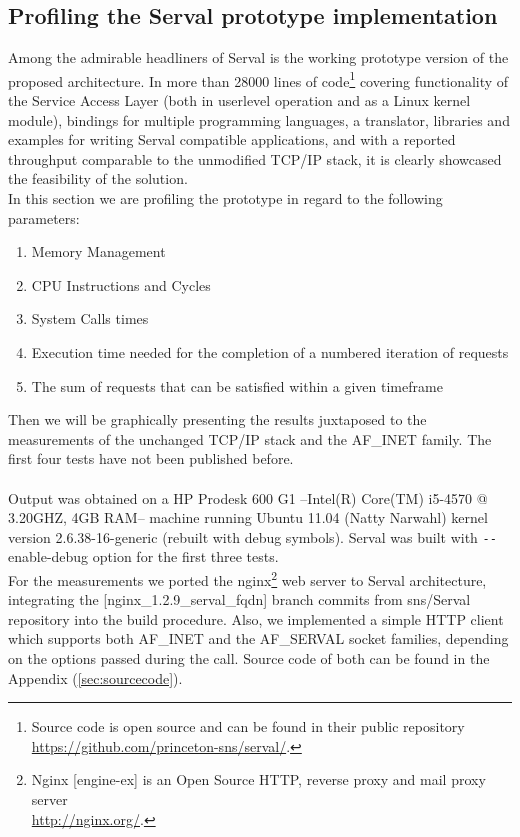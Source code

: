 \subsection{Profiling the Serval prototype implementation}
Among the admirable headliners of Serval is the working prototype version of the proposed architecture.
In more than 28000 lines of code\footnote{Source code is open source and can be found in their public repository\\ \url{https://github.com/princeton-sns/serval/}.} covering functionality of the Service Access Layer (both in userlevel operation and as a Linux kernel module), bindings for multiple programming languages, a translator, libraries and examples for writing Serval compatible applications, and with a reported throughput comparable to the unmodified TCP/IP stack, it is clearly showcased the feasibility of the solution.\\
\indent In this section we are profiling the prototype in regard to the following parameters:
\begin{enumerate}
  \item Memory Management
  \item CPU Instructions and Cycles
  \item System Calls times
  \item Execution time needed for the completion of a numbered iteration of requests
  \item The sum of requests that can be satisfied within a given timeframe
\end{enumerate}
Then we will be graphically presenting the results juxtaposed to the measurements of the unchanged TCP/IP stack and the AF\_INET family. The first four tests have not been published before.

\paragraph{} Output was obtained on a HP Prodesk 600 G1 --Intel(R) Core(TM) i5-4570 @ 3.20GHZ, 4GB RAM-- machine running Ubuntu 11.04 (Natty Narwahl) kernel version 2.6.38-16-generic (rebuilt with debug symbols). Serval was built with \texttt{-{}-}enable-debug option for the first three tests.\\
\indent For the measurements we ported the nginx\footnote{Nginx [engine-ex] is an Open Source HTTP, reverse proxy and mail proxy server\\ \url{http://nginx.org/}.} web server to Serval architecture, integrating the [nginx\_1.2.9\_serval\_fqdn] branch commits from \mbox{sns/Serval} repository into the build procedure.
Also, we implemented a simple HTTP client which supports both AF\_INET and the AF\_SERVAL socket families, depending on the options passed during the call.
Source code of both can be found in the Appendix (\ref{sec:sourcecode}).


\iffalse
gprof
perf
google-profile tools
1) memory (oprofile)
2) CPU cycles (callgrind)
3) system calls time (strace)
4) timed execution of 1000 times
5) requests per second
6) Number of packers per request, bytes sent, packet structure
\fi